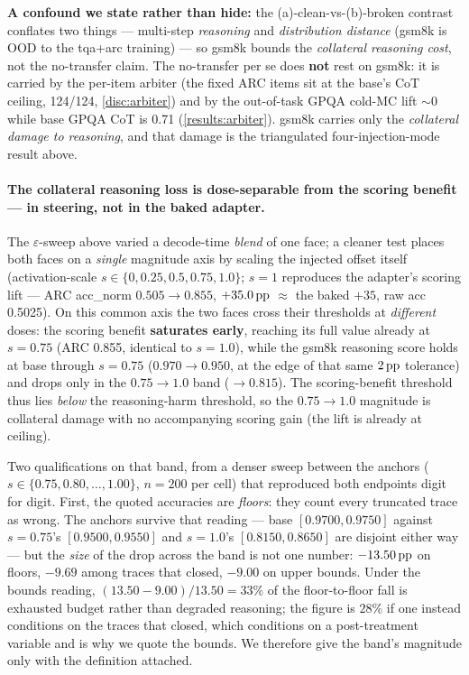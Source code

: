\textbf{A confound we state rather than hide:} the (a)-clean-vs-(b)-broken contrast
conflates two things --- multi-step \emph{reasoning} and \emph{distribution
distance} (gsm8k is OOD to the tqa+arc training) --- so gsm8k bounds the
\emph{collateral reasoning cost}, not the no-transfer claim. The no-transfer per se
does \textbf{not} rest on gsm8k: it is carried by the per-item arbiter (the fixed
ARC items sit at the base's CoT ceiling, 124/124, \cref{disc:arbiter}) and by the
out-of-task GPQA cold-MC lift ${\sim}0$ while base GPQA CoT is 0.71
(\cref{results:arbiter}). gsm8k carries only the \emph{collateral damage to
reasoning}, and that damage is the triangulated four-injection-mode result above.

\paragraph{The collateral reasoning loss is dose-separable from the scoring
benefit --- in steering, not in the baked adapter.}
The $\varepsilon$-sweep above varied a decode-time \emph{blend} of one face; a
cleaner test places both faces on a \emph{single} magnitude axis by scaling the
injected offset itself (activation-scale $s \in \{0, 0.25, 0.5, 0.75, 1.0\}$;
$s{=}1$ reproduces the adapter's scoring lift --- ARC acc\_norm
$0.505{\rightarrow}0.855$, $+35.0\,\mathrm{pp}$ ${\approx}$ the baked $+35$, raw acc 0.5025).
On this common axis the two faces cross their thresholds at \emph{different} doses:
the scoring benefit \textbf{saturates early}, reaching its full value already at
$s{=}0.75$ (ARC 0.855, identical to $s{=}1.0$), while the gsm8k reasoning score
holds at base through $s{=}0.75$ ($0.970{\rightarrow}0.950$, at the edge of that same
$2\,\mathrm{pp}$ tolerance) and drops only in the $0.75{\rightarrow}1.0$ band
($\rightarrow 0.815$). The scoring-benefit threshold thus lies \emph{below} the
reasoning-harm threshold, so the $0.75{\rightarrow}1.0$ magnitude is collateral
damage with no accompanying scoring gain (the lift is already at ceiling).

Two qualifications on that band, from a denser sweep between the anchors
($s \in \{0.75, 0.80, \ldots, 1.00\}$, $n{=}200$ per cell) that reproduced both
endpoints digit for digit. First, the quoted accuracies are \emph{floors}: they
count every truncated trace as wrong. The anchors survive that reading --- base
$[0.9700, 0.9750]$ against $s{=}0.75$'s $[0.9500, 0.9550]$ and $s{=}1.0$'s
$[0.8150, 0.8650]$ are disjoint either way --- but the \emph{size} of the drop
across the band is not one number: $-13.50\,\mathrm{pp}$ on floors, $-9.69$ among traces that
closed, $-9.00$ on upper bounds. Under the bounds reading,
$(13.50-9.00)/13.50 = 33\%$ of the floor-to-floor fall is exhausted budget rather
than degraded reasoning; the figure is $28\%$ if one instead conditions on the traces
that closed, which conditions on a post-treatment variable and is why we quote the
bounds. We therefore give the band's magnitude only with the definition attached.

